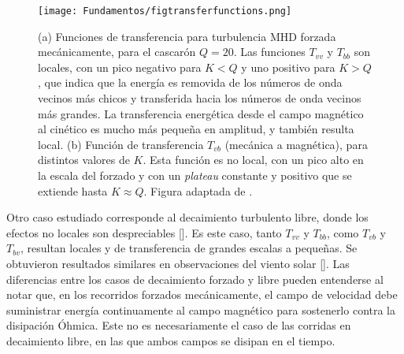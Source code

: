 \begin{figure}[h!]
  \centering
  \texttt{[image: Fundamentos/figtransferfunctions.png]}
  \caption{(a) Funciones de transferencia para turbulencia MHD forzada
    mecánicamente, para el cascarón $Q = 20$. Las funciones $T_{vv}$ y
    $T_{bb}$ son locales, con un pico negativo para $K<Q$ y uno
    positivo para $K>Q$, que indica que la energía es removida de los
    números de onda vecinos más chicos y transferida hacia los números
    de onda vecinos más grandes. La transferencia energética desde el
    campo magnético al cinético es mucho más pequeña en amplitud, y
    también resulta local. (b) Función de transferencia $T_{vb}$
    (mecánica a magnética), para distintos valores de $K$. Esta
    función es no local, con un pico alto en la escala del forzado y
    con un \emph{plateau} constante y positivo que se extiende hasta
    $K\approx Q$. Figura adaptada de \cite{alexakis_imprint_2005}.}
  \label{fig:transferfunctions}
\end{figure}


Otro caso estudiado corresponde al decaimiento turbulento libre, donde
los efectos no locales son despreciables
[\cite{debliquy_energy_2005}]. Es este caso, tanto $T_{vv}$ y $T_{bb}$,
como $T_{vb}$ y $T_{bv}$, resultan locales y de transferencia de
grandes escalas a pequeñas. Se obtuvieron resultados similares en
observaciones del viento solar [\cite{bruno_solar_2005}]. Las
diferencias entre los casos de decaimiento forzado y libre pueden
entenderse al notar que, en los recorridos forzados mecánicamente, el
campo de velocidad debe suministrar energía continuamente al campo
magnético para sostenerlo contra la disipación Óhmica. Este no es
necesariamente el caso de las corridas en decaimiento libre, en las
que ambos campos se disipan en el tiempo.

